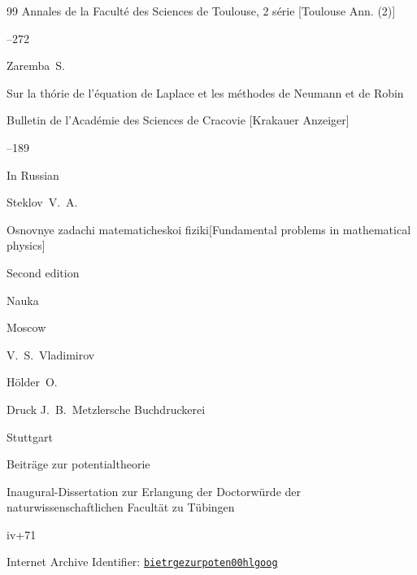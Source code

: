 \begin{thebibliography}{99}
\jour Annales de la Facult\'e des Sciences de Toulouse\rm, 2 s\'erie [Toulouse Ann. (2)]



--272







\by Zaremba~S.

\paper Sur la th\'orie de l'\'equation de Laplace et les m\'ethodes de Neumann et de Robin

\jour Bulletin de l'Acad\'emie des Sciences de Cracovie \rm [Krakauer Anzeiger]


--189





\lang In Russian

\by Steklov~V.~A.

\book Osnovnye zadachi matematicheskoi fiziki\rm  [Fundamental problems in mathematical physics]

Second edition


\publ Nauka

\publaddr Moscow

\ed V.~S.~Vladimirov






\by H\"older~O.


\publ Druck J.~B.~Metzlersche Buchdruckerei

\publaddr Stuttgart

\thesis Beitr\"age zur potentialtheorie

\thesisinfo Inaugural-Dissertation zur Erlangung der Doctor\-w\"urde der naturwissenschaftlichen Facult\"at zu T\"ubingen

\totalpages iv+71

\elink Internet Archive Identifier: \href{https://archive.org/details/bietrgezurpoten00hlgoog}{\tt bietrgezurpoten00hlgoog}






\end{thebibliography}
